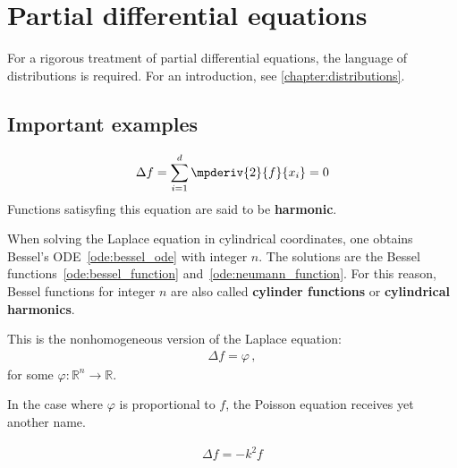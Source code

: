 \chapter{Partial differential equations}\label{chapter:pde}

    For a rigorous treatment of partial differential equations, the language of distributions is required. For an introduction, see \cref{chapter:distributions}.

    \minitoc

\section{Important examples}

    \begin{example}\label{pde:laplace_equation}
        \begin{gather}
            \Delta f = \sum_{i=1}^d\mpderiv{2}{f}{x_i}=0
        \end{gather}
        Functions satisyfing this equation are said to be \textbf{harmonic}.
    \end{example}

    When solving the Laplace equation in cylindrical coordinates, one obtains Bessel's ODE~\eqref{ode:bessel_ode} with integer $n$. The solutions are the Bessel functions~\eqref{ode:bessel_function} and~\eqref{ode:neumann_function}. For this reason, Bessel functions for integer $n$ are also called \textbf{cylinder functions} or \textbf{cylindrical harmonics}.

    \begin{example}
        This is the nonhomogeneous version of the Laplace equation:
        \begin{gather}
            \Delta f = \varphi\,,
        \end{gather}
        for some $\varphi:\mathbb{R}^n\rightarrow\mathbb{R}$.
    \end{example}

    In the case where $\varphi$ is proportional to $f$, the Poisson equation receives yet another name.
    \begin{example}\label{pde:helmholtz_equation}
        \begin{gather}
            \Delta f = -k^2f
        \end{gather}
    \end{example}


